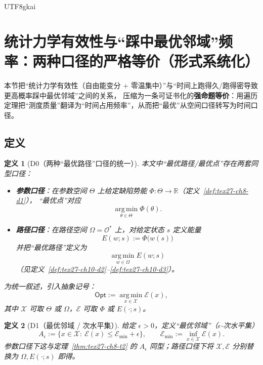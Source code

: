 \documentclass[12pt]{article}
\newtheorem{definition}{定义}[section]
\newcommand{\RR}{\mathbb{R}}
\begin{document}
\begin{CJK*}{UTF8}{gkai}
\clearpage

\section{统计力学有效性与“踩中最优邻域”频率：两种口径的严格等价（形式系统化）}
\label{sec:tex27-ch20-statmech-opt-frequency}

本节把“统计力学有效性（自由能变分 + 零温集中）”与“时间上跑得久/跑得密导致更高概率踩中最优邻域”之间的关系，
压缩为一条可证书化的\textbf{强命题等价}：用遍历定理把“测度质量”翻译为“时间占用频率”，从而把“最优”从空间口径转写为时间口径。

\subsection{定义}
\label{subsec:tex27-ch20-defs}

\begin{definition}[D0（两种“最优路径”口径的统一）]
\label{def:tex27-ch20-d0}
本文中“最优路径/最优点”存在两套同型口径：
\begin{itemize}
  \item \textbf{参数口径}：在参数空间 $\Theta$ 上给定缺陷势能 $\Phi:\Theta\to\RR$（定义~\ref{def:tex27-ch8-d1}），
  “最优点”对应
  \[
    \operatorname*{arg\,min}_{\theta\in\Theta}\Phi(\theta).
  \]
  \item \textbf{路径口径}：在路径空间 $\Omega=\mathcal{O}^*$ 上，对给定状态 $s$ 定义能量
  \[
    E(w;s):=\Phi\bigl(w(s)\bigr)
  \]
  并把“最优路径”定义为
  \[
    \operatorname*{arg\,min}_{w\in\Omega}E(w;s)
  \]
  （见定义~\ref{def:tex27-ch10-d2}--\ref{def:tex27-ch10-d3}）。
\end{itemize}
为统一叙述，引入抽象记号：
\[
  \mathsf{Opt}:=\operatorname*{arg\,min}_{x\in\mathcal{X}}\mathcal{E}(x),
\]
其中 $\mathcal{X}$ 可取 $\Theta$ 或 $\Omega$，$\mathcal{E}$ 可取 $\Phi$ 或 $E(\cdot;s)$。
\end{definition}

\begin{definition}[D1（最优邻域 / 次水平集）]
\label{def:tex27-ch20-d1}
给定 $\epsilon>0$，定义“最优邻域”（$\epsilon$-次水平集）
\[
  A_\epsilon:=\bigl\{x\in\mathcal{X}:\ \mathcal{E}(x)\le \mathcal{E}_{\min}+\epsilon\bigr\},
  \qquad
  \mathcal{E}_{\min}:=\inf_{x\in\mathcal{X}}\mathcal{E}(x).
\]
参数口径下这与定理~\ref{thm:tex27-ch8-t2} 的 $A_\epsilon$ 同型；路径口径下将 $\mathcal{X},\mathcal{E}$ 分别替换为 $\Omega,E(\cdot;s)$ 即得。
\end{definition}


\end{CJK*}
\end{document}
